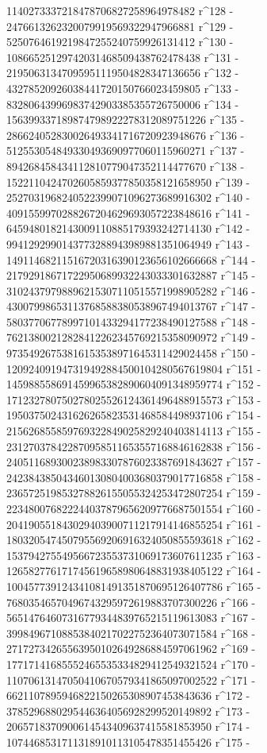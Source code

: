        1140273337218478706827258964978482 r^128 - 
       2476613262320079919569322947966881 r^129 - 
       5250764619219847255240759926131412 r^130 - 
       10866525129742031468509438762478438 r^131 - 
       21950631347095951119504828347136656 r^132 - 
       43278520926038441720150766023459805 r^133 - 
       83280643996983742903385355726750006 r^134 - 
       156399337189874798922278312089751226 r^135 - 
       286624052830026493341716720923948676 r^136 - 
       512553054849330493690977060115960271 r^137 - 
       894268458434112810779047352114477670 r^138 - 
       1522110424702605859377850358121658950 r^139 - 
       2527031968240522399071096273689916302 r^140 - 
       4091559970288267204629693057223848616 r^141 - 
       6459480182143009110885179393242714130 r^142 - 
       9941292990143773288943989881351064949 r^143 - 
       14911468211516720316390123656102666668 r^144 - 
       21792918671722950689932243033301632887 r^145 - 
       31024379798896215307110515571998905282 r^146 - 
       43007998653113768588380538967494013767 r^147 - 
       58037706778997101433294177238490127588 r^148 - 
       76213800212828412262345769215358090972 r^149 - 
       97354926753816153538971645311429024458 r^150 - 
       120924091947319492884500104280567619804 r^151 - 
       145988558691459965382890604091348959774 r^152 - 
       171232780750278025526124361496488915573 r^153 - 
       195037502431626265823531468584498937106 r^154 - 
       215626855859769322849025829240403814113 r^155 - 
       231270378422870958511653557168846162838 r^156 - 
       240511689300238983307876023387691843627 r^157 - 
       242384385043460130804003680379017716858 r^158 - 
       236572519853278826155055324253472807254 r^159 - 
       223480076822244037879656209776687501554 r^160 - 
       204190551843029403900711217914146855254 r^161 - 
       180320547450795569206916324050855593618 r^162 - 
       153794275549566723553731069173607611235 r^163 - 
       126582776171745619658980648831938405122 r^164 - 
       100457739124341081491351870695126407786 r^165 - 
       76803546570496743295972619883707300226 r^166 - 
       56514764607316779344839765215119613083 r^167 - 
       39984967108853840217022752364073071584 r^168 - 
       27172734265563950102649286884597061962 r^169 - 
       17717141685552465535334829412549321524 r^170 - 
       11070613147050410670579341865097002522 r^171 - 
       6621107895946822150265308907453843636 r^172 - 
       3785296880295446364056928299520149892 r^173 - 
       2065718370900614543409637415581853950 r^174 - 
       1074468531711318910113105478351455426 r^175 - 
